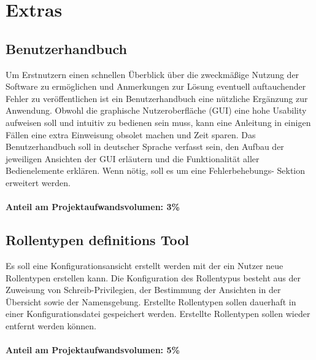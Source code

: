 \section{Extras}
    \subsection{Benutzerhandbuch}

    Um Erstnutzern einen schnellen Überblick über die zweckmäßige Nutzung der
    Software zu ermöglichen und Anmerkungen zur Lösung eventuell auftauchender
    Fehler zu veröffentlichen ist ein Benutzerhandbuch eine nützliche Ergänzung
    zur Anwendung. Obwohl die graphische Nutzeroberfläche (GUI) eine hohe
    Usability aufweisen soll und intuitiv zu bedienen sein muss, kann eine
    Anleitung in einigen Fällen eine extra Einweisung obsolet machen und Zeit
    sparen. Das Benutzerhandbuch soll in deutscher Sprache verfasst sein, den
    Aufbau der jeweiligen Ansichten der GUI erläutern und die Funktionalität
    aller Bedienelemente erklären. Wenn nötig, soll es um eine Fehlerbehebungs-
    Sektion erweitert werden.\\
    \\
    \textbf{Anteil am Projektaufwandsvolumen: 3\%}


    \subsection{Rollentypen definitions Tool}

    Es soll eine Konfigurationsansicht erstellt werden mit der ein Nutzer neue 
    Rollentypen erstellen kann. Die Konfiguration des Rollentypus besteht aus
    der Zuweisung von Schreib-Privilegien, der Bestimmung der Ansichten in der
    Übersicht sowie der Namensgebung. Erstellte Rollentypen sollen dauerhaft in
    einer Konfigurationsdatei gespeichert werden. Erstellte Rollentypen sollen 
    wieder entfernt werden können.\\
    \\
    \textbf{Anteil am Projektaufwandsvolumen: 5\%}